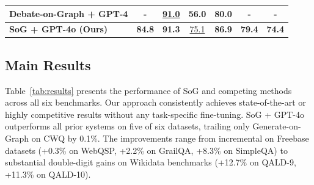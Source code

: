 \documentclass[sigconf]{acmart}
\begin{document}
\begin{table}[t]
\begin{tabular}{lcccccc}
Debate-on-Graph + GPT-4 \citep{ma2025debate} & - & \underline{91.0} & 56.0 & 80.0 & - & - \\
\midrule
\textbf{SoG + GPT-4o (Ours)} & \textbf{84.8} & \textbf{91.3} & \underline{75.1} & \textbf{86.9} & \textbf{79.4} & \textbf{74.4} \\
\bottomrule
\end{tabular}
\end{table}

\subsection{Main Results}
\label{sec:main_results}

Table~\ref{tab:results} presents the performance of SoG and competing methods across all six benchmarks. Our approach consistently achieves state-of-the-art or highly competitive results without any task-specific fine-tuning. SoG + GPT-4o outperforms all prior systems on five of six datasets, trailing only Generate-on-Graph on CWQ by 0.1\%. The improvements range from incremental on Freebase datasets (+0.3\% on WebQSP, +2.2\% on GrailQA, +8.3\% on SimpleQA) to substantial double-digit gains on Wikidata benchmarks (+12.7\% on QALD-9, +11.3\% on QALD-10).
\end{document}

